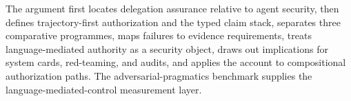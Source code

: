 The argument first locates delegation assurance relative to agent security, then defines trajectory-first authorization and the typed claim stack, separates three comparative programmes, maps failures to evidence requirements, treats language-mediated authority as a security object, draws out implications for system cards, red-teaming, and audits, and applies the account to compositional authorization paths. The adversarial-pragmatics benchmark \parencite{reynolds2026adversarialPragmatics} supplies the language-mediated-control measurement layer.
